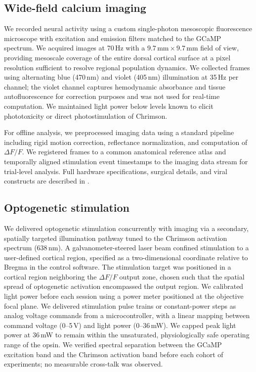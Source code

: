 \subsection*{Wide-field calcium imaging}

We recorded neural activity using a custom single-photon mesoscopic
fluorescence microscope with excitation and emission filters matched to
the GCaMP spectrum. We acquired images at 70\,Hz with a
$9.7\,\mathrm{mm} \times 9.7\,\mathrm{mm}$ field of view, providing
mesoscale coverage of the entire dorsal cortical surface at a pixel
resolution sufficient to resolve regional population dynamics. We
collected frames using alternating blue (470\,nm) and violet (405\,nm)
illumination at 35\,Hz per channel; the violet channel captures
hemodynamic absorbance and tissue autofluorescence for correction
purposes and was not used for real-time computation. We maintained light
power below levels known to elicit phototoxicity or direct
photostimulation of Chrimson.

For offline analysis, we preprocessed imaging data using a standard
pipeline including rigid motion correction, reflectance normalization,
and computation of $\Delta F/F$. We registered frames to a common
anatomical reference atlas and temporally aligned stimulation event
timestamps to the imaging data stream for trial-level analysis. Full
hardware specifications, surgical details, and viral constructs are
described in \citet{Matveev2024}.

\subsection*{Optogenetic stimulation}

We delivered optogenetic stimulation concurrently with imaging via a
secondary, spatially targeted illumination pathway tuned to the Chrimson
activation spectrum (638\,nm). A galvanometer-steered laser beam
confined stimulation to a user-defined cortical region, specified as a
two-dimensional coordinate relative to Bregma in the control software.
The stimulation target was positioned in a cortical region neighboring
the $\Delta F/F$ output zone, chosen such that the spatial spread of
optogenetic activation encompassed the output region. We calibrated
light power before each session using a power meter positioned at the
objective focal plane. We delivered stimulation pulse trains or
constant-power steps as analog voltage commands from a microcontroller,
with a linear mapping between command voltage (0--5\,V) and light power
(0--36\,mW). We capped peak light power at 36\,mW to remain within the
unsaturated, physiologically safe operating range of the opsin. We
verified spectral separation between the GCaMP excitation band and the
Chrimson activation band before each cohort of experiments; no
measurable cross-talk was observed.

